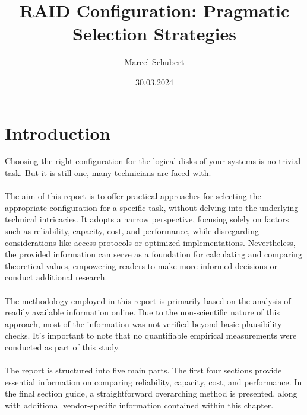 \documentclass{article}
\title{RAID Configuration: Pragmatic Selection Strategies}
\author{Marcel Schubert}
\date{30.03.2024}
\begin{document}
\maketitle

\section*{Introduction}
Choosing the right configuration for the logical disks
of your systems is no trivial task. But it is still one, many technicians are faced with. 
\\ \\
The aim of this report is to offer practical approaches for selecting the appropriate configuration for a specific task, without delving into the underlying technical intricacies. It adopts a narrow perspective, focusing solely on factors such as reliability, capacity, cost, and performance, while disregarding considerations like access protocols or optimized implementations. Nevertheless, the provided information can serve as a foundation for calculating and comparing theoretical values, empowering readers to make more informed decisions or conduct additional research.
\\ \\
The methodology employed in this report is primarily based on the analysis of readily available information online. Due to the non-scientific nature of this approach, most of the information was not verified beyond basic plausibility checks. It's important to note that no quantifiable empirical measurements were conducted as part of this study.
\\ \\
The report is structured into five main parts. The first four sections provide essential information on comparing reliability, capacity, cost, and performance. In the final section guide, a straightforward overarching method is presented, along with additional vendor-specific information contained within this chapter.
\pagebreak
\tableofcontents
\pagebreak
\end{document}
